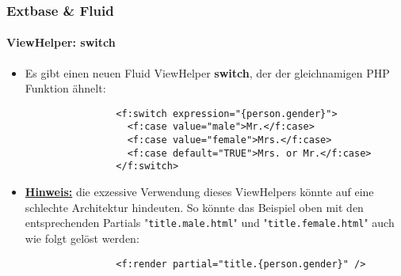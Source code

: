 \begin{frame}[fragile]
	\frametitle{Extbase \& Fluid}
	\framesubtitle{ViewHelper: switch}

	\lstset{
		basicstyle=\smaller\ttfamily
	}

	\begin{itemize}
		\item Es gibt einen neuen Fluid ViewHelper \textbf{switch}, der der gleichnamigen PHP Funktion ähnelt:
			
			\begin{lstlisting}
				<f:switch expression="{person.gender}">
				  <f:case value="male">Mr.</f:case>
				  <f:case value="female">Mrs.</f:case>
				  <f:case default="TRUE">Mrs. or Mr.</f:case>
				</f:switch>
			\end{lstlisting}

		\item \textbf{\underline{Hinweis:}} die exzessive Verwendung dieses ViewHelpers könnte auf eine schlechte Architektur hindeuten.
			So könnte das Beispiel oben mit den entsprechenden Partials "\texttt{title.male.html}" und "\texttt{title.female.html}" auch wie folgt gelöst werden:

			\begin{lstlisting}
				<f:render partial="title.{person.gender}" />
			\end{lstlisting}

	\end{itemize}

\end{frame}


